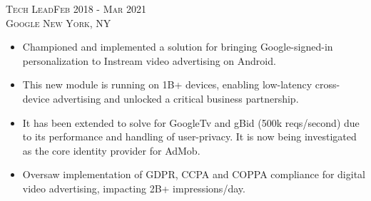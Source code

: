   
\textsc{Tech Lead\hfill Feb 2018 - Mar 2021\\}
\textsc{Google \hfill New York, NY\\}
\begin{itemize}
	\setlength{\itemsep}{1pt}
	\setlength{\parskip}{0pt}
	\setlength{\parsep}{0pt}
	\setlength{\leftmargin}{-5mm}
  \item Championed and implemented a solution for bringing Google-signed-in personalization to Instream video advertising on Android.
  \item This new module is running on 1B+ devices, enabling low-latency cross-device advertising and unlocked a critical business partnership.
 
  \item It has been extended to solve for GoogleTv and gBid (500k reqs/second) due to its performance and handling of user-privacy. It is now being investigated as the core identity provider for AdMob. 
  
  \item Oversaw implementation of GDPR, CCPA and COPPA compliance for digital video advertising, impacting 2B+ impressions/day.






\end{itemize}

